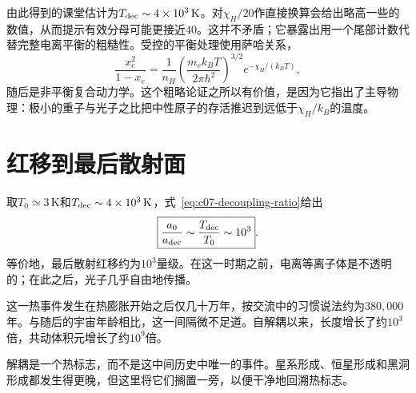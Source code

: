 \begin{classroomqa}
\end{classroomqa}

\begin{classroomqa}
\end{classroomqa}

由此得到的课堂估计为\(T_{\rm dec}\sim4\times10^3\,\mathrm{K}\)。对\(\chi_H/20\)作直接换算会给出略高一些的数值，从而提示有效分母可能更接近\(40\)。这并不矛盾；它暴露出用一个尾部计数代替完整电离平衡的粗糙性。受控的平衡处理使用萨哈关系，
\begin{equation}
\frac{x_e^2}{1-x_e}
=
\frac{1}{n_H}
\left(\frac{m_e k_BT}{2\pi\hbar^2}\right)^{3/2}
e^{-\chi_H/(k_BT)},
\label{eq:c07-saha}
\end{equation}
随后是非平衡复合动力学。这个粗略论证之所以有价值，是因为它指出了主导物理：极小的重子与光子之比把中性原子的存活推迟到远低于\(\chi_H/k_B\)的温度。

\section{红移到最后散射面}

取\(T_0\simeq3\,\mathrm{K}\)和\(T_{\rm dec}\sim4\times10^3\,\mathrm{K}\)，式~\eqref{eq:c07-decoupling-ratio}给出
\begin{equation}
\boxed{
\frac{a_0}{a_{\rm dec}}
\sim
\frac{T_{\rm dec}}{T_0}
\sim10^3
}.
\label{eq:c07-decoupling-expansion}
\end{equation}
等价地，最后散射红移约为\(10^3\)量级。在这一时期之前，电离等离子体是不透明的；在此之后，光子几乎自由地传播。

这一热事件发生在热膨胀开始之后仅几十万年，按交流中的习惯说法约为\(380{,}000\)年。与随后的宇宙年龄相比，这一间隔微不足道。自解耦以来，长度增长了约\(10^3\)倍，共动体积元增长了约\(10^9\)倍。

解耦是一个热标志，而不是这中间历史中唯一的事件。星系形成、恒星形成和黑洞形成都发生得更晚，但这里将它们搁置一旁，以便干净地回溯热标志。

